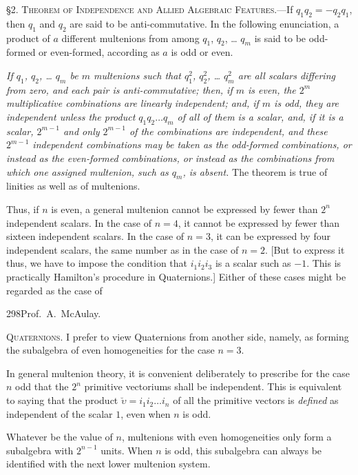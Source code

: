 \documentclass[11pt]{article}
\begin{document}
\noindent\textsc{\S 2. Theorem of Independence and Allied Algebraic Features.}---If $q_1q_2=-q_2q_1$, then $q_1$ and $q_2$ are said to be anti-commutative. In the following enunciation, a product of $a$ different multenions from among $q_1$, $q_2$, \ldots{} $q_m$ is said to be odd-formed or even-formed, according as $a$ is odd or even.

\indent \emph{If $q_1$, $q_2$, \ldots{} $q_m$ be $m$ multenions such that $q_1^2$, $q_2^2$, \ldots{} $q_m^2$ are all scalars differing from zero, and each pair is anti-commutative; then, if $m$ is even, the $2^m$ multiplicative combinations are linearly independent; and, if $m$ is odd, they are independent unless the product $q_1q_2\ldots q_m$ of all of them is a scalar, and, if it is a scalar, $2^{m-1}$ and only $2^{m-1}$ of the combinations are independent, and these $2^{m-1}$ independent combinations may be taken as the odd-formed combinations, or instead as the even-formed combinations, or instead as the combinations from which one assigned multenion, such as $q_m$, is absent.} The theorem is true of linities as well as of multenions.

\indent Thus, if $n$ is even, a general multenion cannot be expressed by fewer than $2^n$ independent scalars. In the case of $n=4$, it cannot be expressed by fewer than sixteen independent scalars. In the case of $n=3$, it can be expressed by four independent scalars, the same number as in the case of $n=2$. [But to express it thus, we have to impose the condition that $i_1i_2i_3$ is a scalar such as $-1$. This is practically Hamilton's procedure in Quaternions.] Either of these cases might be regarded as the case of

\newpage\thispagestyle{empty}
\begin{center}298\hfill Prof.\ A.\ McAulay.\end{center}
\noindent\textsc{Quaternions.} I prefer to view Quaternions from another side, namely, as forming the subalgebra of even homogeneities for the case $n=3$.

\indent In general multenion theory, it is convenient deliberately to prescribe for the case $n$ odd that the $2^n$ primitive vectoriums shall be independent. This is equivalent to saying that the product $\breve{\upsilon}=i_1i_2\ldots i_n$ of all the primitive vectors is \emph{defined} as independent of the scalar $1$, even when $n$ is odd.

\indent Whatever be the value of $n$, multenions with even homogeneities only form a subalgebra with $2^{n-1}$ units. When $n$ is odd, this subalgebra can always be identified with the next lower multenion system.
\end{document}
